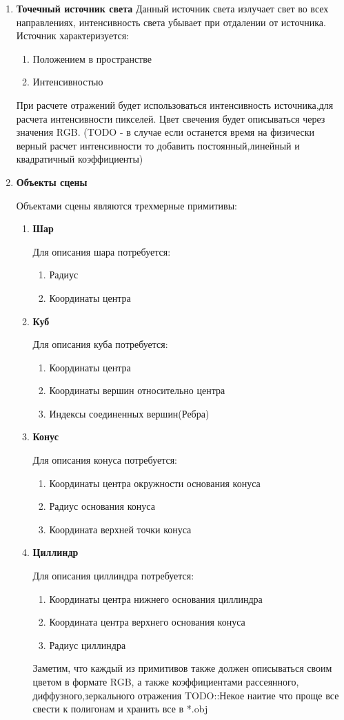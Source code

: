 \documentclass[a4paper,14pt, unknownkeysallowed]{extreport}
\begin{document}
\begin{enumerate}
	\item \textbf{Точечный источник света}
	Данный источник света излучает свет во всех направлениях, интенсивность света убывает при отдалении от источника.
	Источник характеризуется:
	\begin{enumerate}
		\item Положением в пространстве
		\item Интенсивностью
	\end{enumerate}
	При расчете отражений будет использоваться интенсивность источника,для расчета интенсивности пикселей. Цвет свечения будет описываться через значения RGB.
	(TODO - в случае если останется время на физически верный расчет интенсивности то добавить постоянный,линейный и квадратичный коэффициенты)
	\item \textbf{Объекты сцены}
	
	Объектами сцены являются трехмерные примитивы:
	\begin{enumerate}
		\item \textbf{Шар}
		
		Для описания шара потребуется:
		\begin{enumerate}
			\item Радиус
			\item Координаты центра
		\end{enumerate}
		\item  \textbf{Куб}
		
		Для описания куба потребуется:
		\begin{enumerate}
			\item Координаты центра
			\item Координаты вершин относительно центра
			\item Индексы соединенных вершин(Ребра)
		\end{enumerate}
		\item  \textbf{Конус}
		
		Для описания конуса потребуется:
		\begin{enumerate}
			\item Координаты центра окружности основания конуса
			\item Радиус основания конуса
			\item Координата верхней точки конуса
		\end{enumerate}
		\item  \textbf{Циллиндр}
		
		Для описания циллиндра потребуется:
		\begin{enumerate}
			\item Координаты центра нижнего основания циллиндра
			\item Координата центра верхнего основания конуса
			\item Радиус циллиндра
		\end{enumerate}
		Заметим, что каждый из примитивов также должен описываться своим цветом в формате RGB, а также
		коэффициентами рассеянного, диффузного,зеркального отражения
		TODO::Некое наитие что проще все свести к полигонам и хранить все в *.obj
	\end{enumerate}


\end{enumerate}
\end{document}
